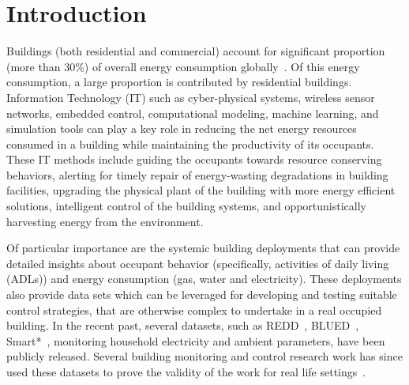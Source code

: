 \documentclass[10pt]{sensys-proc}
\begin{document}
\section{Introduction}
\label{sec:intro}
Buildings (both residential and commercial) account for significant proportion (more than 30\%) of overall energy consumption globally~\cite{evans09india}. %
Of this energy consumption, a large proportion is contributed by residential buildings. %
Information Technology (IT) such as cyber-physical systems, wireless sensor networks, embedded control, computational modeling, machine learning, and simulation tools can play a key role in reducing the net energy resources consumed in a building while maintaining the productivity of its occupants. These IT methods include guiding the occupants towards resource conserving behaviors, alerting for timely repair of energy-wasting degradations in building facilities, upgrading the physical plant of the building with more energy efficient solutions, intelligent control of the building systems, and opportunistically harvesting energy from the environment.
 
Of particular importance are the systemic building deployments that can provide detailed insights about occupant behavior (specifically, activities of daily living (ADLs)) and energy consumption (gas, water and electricity). These deployments also provide data sets which can be leveraged for developing and testing suitable control strategies, that are otherwise complex to undertake in a real occupied building. In the recent past, several datasets, such as REDD~\cite{redd}, BLUED~\cite{blued_cmu}, Smart*~\cite{smart}, monitoring household electricity and ambient parameters, have been publicly released. Several building monitoring and control research work has since used these datasets to prove the validity of the work for real life settings~\cite{parson2012_aaai,smartcap}.  
\end{document}

